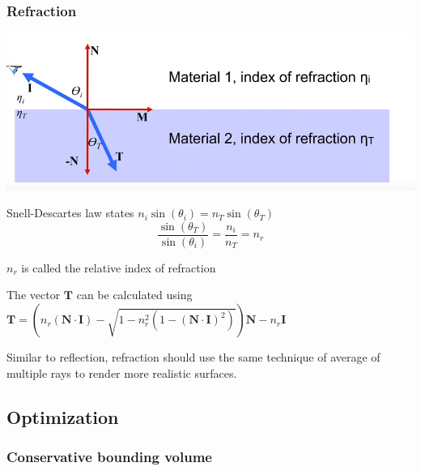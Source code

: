 \documentclass[12pt]{article}
\begin{document}
\subsubsection{Refraction}

\includegraphics[scale=.5]{images/refraction.png}

Snell-Descartes law states $n_i \sin(\theta_i) = n_T \sin(\theta_T)$
\[ \frac{\sin(\theta_T)}{\sin(\theta_i)} = \frac{n_i}{n_T} = n_r \]

$n_r$ is called the relative index of refraction

The vector $\bm T$ can be calculated using $\bm T = \left(n_r(\bm N \cdot
\bm I) - \sqrt{1 - n_r^2(1-(\bm N \cdot \bm I)^2)}\right) \bm N - n_r \bm I$

Similar to reflection, refraction should use the same technique of
average of multiple rays to render more realistic surfaces.

\subsection{Optimization}

\subsubsection{Conservative bounding volume}
\end{document}
